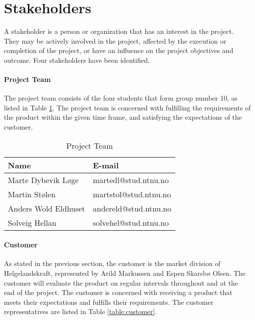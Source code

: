 \section{Stakeholders}

A stakeholder is a person or organization that has an interest in the project. They may be actively involved in the project, affected by the execution or completion of the project, or have an influence on the project objectives and outcome. Four stakeholders have been identified. \cite{stakeholder}


\paragraph{Project Team}

The project team consists of the four students that form group number 10, as listed in Table \ref{table:team}. The project team is concerned with fulfilling the requirements of the product within the given time frame, and satisfying the expectations of the customer.


\begin{table}[H]
\begin{center}
    \begin{tabular}{| l | l |}
   	\hline
    \rowcolor{gray}
    {\bf Name} & {\bf E-mail} \\ \hline
    Marte Dybevik Løge & martedl@stud.ntnu.no \\ \hline
    Martin Stølen & martstol@stud.ntnu.no \\ \hline
    Anders Wold Eldhuset & andereld@stud.ntnu.no \\ \hline
    Solveig Hellan & solvehel@stud.ntnu.no \\ 
    \hline
    \end{tabular}
\end{center}

\caption{Project Team}
\label{table:team}
\end{table}

\paragraph{Customer}

As stated in the previous section, the customer is the market division of Helgelandskraft, represented by Arild Markussen and Espen Skarsbø Olsen. The customer will evaluate the product on regular intervals throughout and at the end of the project. The customer is concerned with receiving a product that meets their expectations and fulfills their requirements. The customer representatives are listed in Table \ref{table:customer}.

